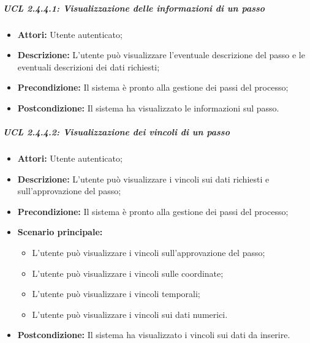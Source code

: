 \subparagraph{UCL 2.4.4.1: Visualizzazione delle informazioni di un passo}
\begin{itemize}
\item \textbf{Attori:} Utente autenticato;
\item \textbf{Descrizione:} L'utente può visualizzare l'eventuale descrizione del passo e le eventuali descrizioni dei dati richiesti;
\item \textbf{Precondizione:} Il sistema è pronto alla gestione dei passi del processo;
\item \textbf{Postcondizione:} Il sistema ha visualizzato le informazioni sul passo.
\end{itemize}

\subparagraph{UCL 2.4.4.2: Visualizzazione dei vincoli di un passo}
\begin{itemize}
\item \textbf{Attori:} Utente autenticato;
\item \textbf{Descrizione:} L'utente può visualizzare i vincoli sui dati richiesti e sull'approvazione del passo;
\item \textbf{Precondizione:} Il sistema è pronto alla gestione dei passi del processo;
\item \textbf{Scenario principale:}
\begin{itemize}
\item L'utente può visualizzare i vincoli sull'approvazione del passo;
\item L'utente può visualizzare i vincoli sulle coordinate;
\item L'utente può visualizzare i vincoli temporali;
\item L'utente può visualizzare i vincoli sui dati numerici.
\end{itemize}
\item \textbf{Postcondizione:} Il sistema ha visualizzato i vincoli sui dati da inserire.
\end{itemize}


